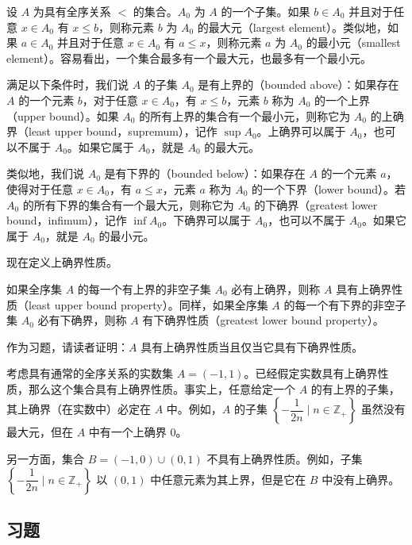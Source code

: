 \documentclass[../../main.tex]{subfiles}
\begin{document}
设 $A$ 为具有全序关系 $<$ 的集合。$A_{0}$ 为 $A$ 的一个子集。如果 $b \in A_{0}$ 并且对于任意 $x \in A_{0}$ 有 $x \leqslant b$，则称元素 $b$ 为 $A_{0}$ 的最大元（largest element）。类似地，如果 $a \in A_{0}$ 并且对于任意 $x \in A_{0}$ 有 $a \leqslant x$，则称元素 $a$ 为 $A_{0}$ 的最小元（smallest element）。容易看出，一个集合最多有一个最大元，也最多有一个最小元。

满足以下条件时，我们说 $A$ 的子集 $A_{0}$ 是有上界的（bounded above）：如果存在 $A$ 的一个元素 $b$，对于任意 $x \in A_{0}$，有 $x \leqslant b$，元素 $b$ 称为 $A_{0}$ 的一个上界（upper bound）。如果 $A_{0}$ 的所有上界的集合有一个最小元，则称它为 $A_{0}$ 的上确界（least upper bound，supremum），记作 $\sup A_{0}$。上确界可以属于 $A_{0}$，也可以不属于 $A_{0}$。如果它属于 $A_{0}$，就是 $A_{0}$ 的最大元。

类似地，我们说 $A_{0}$ 是有下界的（bounded below）：如果存在 $A$ 的一个元素 $a$，使得对于任意 $x \in A_{0}$，有 $a \leqslant x$，元素 $a$ 称为 $A_{0}$ 的一个下界（lower bound）。若 $A_{0}$ 的所有下界的集合有一个最大元，则称它为 $A_{0}$ 的下确界（greatest lower bound，infimum），记作 $\inf A_{0}$。下确界可以属于 $A_{0}$，也可以不属于 $A_{0}$。如果它属于 $A_{0}$，就是 $A_{0}$ 的最小元。

现在定义上确界性质。

\begin{definition}[上确界性质]\label{definition:ch01-上确界性质}
如果全序集 $A$ 的每一个有上界的非空子集 $A_{0}$ 必有上确界，则称 $A$ 具有上确界性质（least upper bound property）。同样，如果全序集 $A$ 的每一个有下界的非空子集 $A_{0}$ 必有下确界，则称 $A$ 有下确界性质（greatest lower bound property）。
\end{definition}

作为习题，请读者证明：$A$ 具有上确界性质当且仅当它具有下确界性质。

\begin{example}\label{example:ch01-上确界例}
考虑具有通常的全序关系的实数集 $A = (-1, 1)$。已经假定实数具有上确界性质，那么这个集合具有上确界性质。事实上，任意给定一个 $A$ 的有上界的子集，其上确界（在实数中）必定在 $A$ 中。例如，$A$ 的子集 $\left\{-\dfrac{1}{2n} \mid n \in \mathbb{Z}_{+}\right\}$ 虽然没有最大元，但在 $A$ 中有一个上确界 $0$。

另一方面，集合 $B = (-1, 0) \cup (0, 1)$ 不具有上确界性质。例如，子集 $\left\{-\dfrac{1}{2n} \mid n \in \mathbb{Z}_{+}\right\}$ 以 $(0, 1)$ 中任意元素为其上界，但是它在 $B$ 中没有上确界。
\end{example}

\subsection*{习题}
\end{document}
